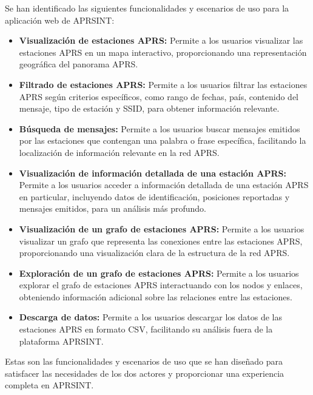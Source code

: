 Se han identificado las siguientes funcionalidades y escenarios de uso para la aplicación web de APRSINT:
\begin{itemize}
	\item \textbf{Visualización de estaciones APRS:} Permite a los usuarios visualizar las estaciones APRS en un mapa interactivo, proporcionando una representación geográfica del panorama APRS.
	\item \textbf{Filtrado de estaciones APRS:} Permite a los usuarios filtrar las estaciones APRS según criterios específicos, como rango de fechas, país, contenido del mensaje, tipo de estación y SSID, para obtener información relevante.

	\item \textbf{Búsqueda de mensajes:} Permite a los usuarios buscar mensajes emitidos por las estaciones que contengan una palabra o frase específica, facilitando la localización de información relevante en la red APRS.

	\item \textbf{Visualización de información detallada de una estación APRS:} Permite a los usuarios acceder a información detallada de una estación APRS en particular, incluyendo datos de identificación, posiciones reportadas y mensajes emitidos, para un análisis más profundo.

	\item \textbf{Visualización de un grafo de estaciones APRS:} Permite a los usuarios visualizar un grafo que representa las conexiones entre las estaciones APRS, proporcionando una visualización clara de la estructura de la red APRS.

	\item \textbf{Exploración de un grafo de estaciones APRS:} Permite a los usuarios explorar el grafo de estaciones APRS interactuando con los nodos y enlaces, obteniendo información adicional sobre las relaciones entre las estaciones.

	\item \textbf{Descarga de datos:} Permite a los usuarios descargar los datos de las estaciones APRS en formato CSV, facilitando su análisis fuera de la plataforma APRSINT.

\end{itemize}

\noindent Estas son las funcionalidades y escenarios de uso que se han diseñado para satisfacer las necesidades de los dos actores y proporcionar una experiencia completa en APRSINT.
